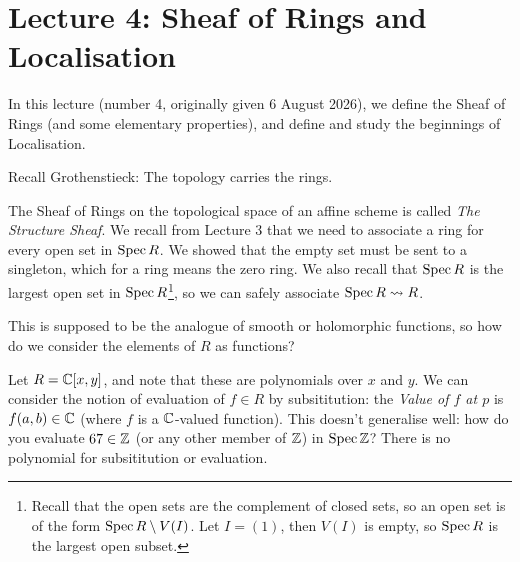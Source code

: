 
\newpage

\section*{Lecture 4: Sheaf of Rings and Localisation}

In this lecture (number 4, originally given 6 August 2026), we define the Sheaf of Rings (and some elementary properties), and define and study the beginnings of Localisation.

Recall Grothenstieck: The topology carries the rings.

The Sheaf of Rings on the topological space of an affine scheme is called \emph{The Structure Sheaf}.
We recall from Lecture 3 that we need to associate a ring for every open set in $\operatorname{Spec}{R}$.
We showed that the empty set must be sent to a singleton, which for a ring means the zero ring.
We also recall that $\operatorname{Spec}{R}$ is the largest open set in $\operatorname{Spec}{R}$\footnote{
    Recall that the open sets are the complement of closed sets, so an open set is of the form $\operatorname{Spec}{R}\setminus{V(I)}$. Let $I=(1)$, then $V(I)$ is empty, so $\operatorname{Spec}{R}$ is the largest open subset.}, 
    so we can safely associate $\operatorname{Spec}{R}\rightsquigarrow R$.

This is supposed to be the analogue of smooth or holomorphic functions, so how do we consider the elements of $R$ as functions?

\begin{example}
    Let $R=\mathbb{C}[x,y]$, and note that these are polynomials over $x$ and $y$.
    We can consider the notion of evaluation of $f\in R$ by subsititution: the \emph{Value of $f$ at $p$} is $f(a,b)\in\mathbb{C}$ (where $f$ is a $\mathbb{C}$-valued function).
    This doesn't generalise well: how do you evaluate $67\in\mathbb{Z}$ (or any other member of $\mathbb{Z}$) in $\operatorname{Spec}\mathbb{Z}$? There is no polynomial for subsititution or evaluation.
\end{example}

